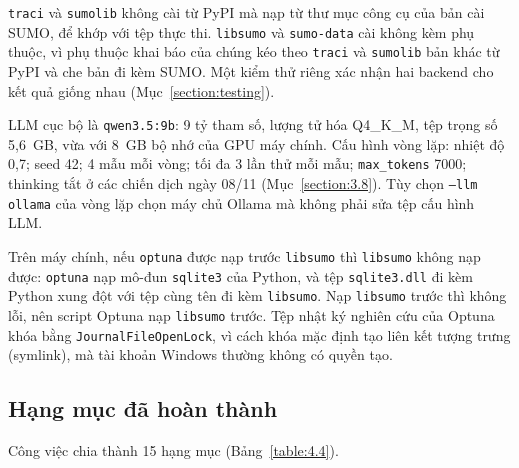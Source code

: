 \documentclass[../main.tex]{subfiles}
\begin{document}
\texttt{traci} và \texttt{sumolib} không cài từ PyPI mà nạp từ thư mục công cụ của bản cài SUMO, để khớp với tệp thực thi. \texttt{libsumo} và \texttt{sumo-data} cài không kèm phụ thuộc, vì phụ thuộc khai báo của chúng kéo theo \texttt{traci} và \texttt{sumolib} bản khác từ PyPI và che bản đi kèm SUMO. Một kiểm thử riêng xác nhận hai backend cho kết quả giống nhau (Mục~\ref{section:testing}).

LLM cục bộ là \texttt{qwen3.5:9b}: 9 tỷ tham số, lượng tử hóa Q4\_K\_M, tệp trọng số 5,6~GB, vừa với 8~GB bộ nhớ của GPU máy chính. Cấu hình vòng lặp: nhiệt độ 0,7; seed 42; 4 mẫu mỗi vòng; tối đa 3 lần thử mỗi mẫu; \texttt{max\_tokens} 7000; thinking tắt ở các chiến dịch ngày 08/11 (Mục~\ref{section:3.8}). Tùy chọn \texttt{--llm ollama} của vòng lặp chọn máy chủ Ollama mà không phải sửa tệp cấu hình LLM.

Trên máy chính, nếu \texttt{optuna} được nạp trước \texttt{libsumo} thì \texttt{libsumo} không nạp được: \texttt{optuna} nạp mô-đun \texttt{sqlite3} của Python, và tệp \texttt{sqlite3.dll} đi kèm Python xung đột với tệp cùng tên đi kèm \texttt{libsumo}. Nạp \texttt{libsumo} trước thì không lỗi, nên script Optuna nạp \texttt{libsumo} trước. Tệp nhật ký nghiên cứu của Optuna khóa bằng \texttt{JournalFileOpenLock}, vì cách khóa mặc định tạo liên kết tượng trưng (symlink), mà tài khoản Windows thường không có quyền tạo.

\subsection{Hạng mục đã hoàn thành}

Công việc chia thành 15 hạng mục (Bảng~\ref{table:4.4}).
\end{document}

